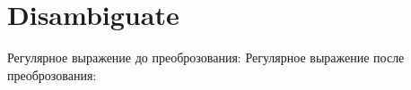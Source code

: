 \section{Disambiguate}
\begin{frame}{}
	Регулярное выражение до преоброзования:
	Регулярное выражение после преоброзования:
\end{frame}
